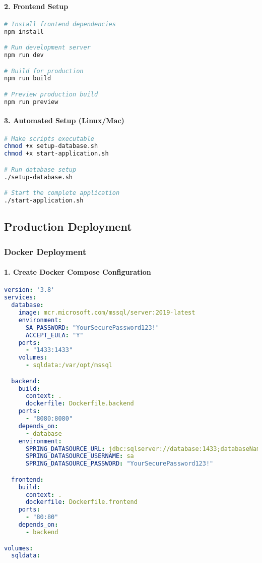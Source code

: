 \documentclass[12pt,a4paper]{article}
\begin{document}
\paragraph{2. Frontend Setup}
\begin{lstlisting}[language=bash]
# Install frontend dependencies
npm install

# Run development server
npm run dev

# Build for production
npm run build

# Preview production build
npm run preview
\end{lstlisting}

\paragraph{3. Automated Setup (Linux/Mac)}
\begin{lstlisting}[language=bash]
# Make scripts executable
chmod +x setup-database.sh
chmod +x start-application.sh

# Run database setup
./setup-database.sh

# Start the complete application
./start-application.sh
\end{lstlisting}

\subsection{Production Deployment}

\subsubsection{Docker Deployment}

\paragraph{1. Create Docker Compose Configuration}
\begin{lstlisting}[language=yaml]
version: '3.8'
services:
  database:
    image: mcr.microsoft.com/mssql/server:2019-latest
    environment:
      SA_PASSWORD: "YourSecurePassword123!"
      ACCEPT_EULA: "Y"
    ports:
      - "1433:1433"
    volumes:
      - sqldata:/var/opt/mssql

  backend:
    build:
      context: .
      dockerfile: Dockerfile.backend
    ports:
      - "8080:8080"
    depends_on:
      - database
    environment:
      SPRING_DATASOURCE_URL: jdbc:sqlserver://database:1433;databaseName=hiv_clinic
      SPRING_DATASOURCE_USERNAME: sa
      SPRING_DATASOURCE_PASSWORD: "YourSecurePassword123!"

  frontend:
    build:
      context: .
      dockerfile: Dockerfile.frontend
    ports:
      - "80:80"
    depends_on:
      - backend

volumes:
  sqldata:
\end{lstlisting}
\end{document}
